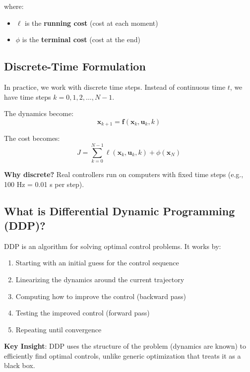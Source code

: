 \documentclass[11pt,a4paper]{article}
\begin{document}
where:
\begin{itemize}
    \item $\ell$ is the \textbf{running cost} (cost at each moment)
    \item $\phi$ is the \textbf{terminal cost} (cost at the end)
\end{itemize}

\subsection{Discrete-Time Formulation}

In practice, we work with discrete time steps. Instead of continuous time $t$, we have time steps $k = 0, 1, 2, \ldots, N-1$.

The dynamics become:
\begin{equation}
\mathbf{x}_{k+1} = \mathbf{f}(\mathbf{x}_k, \mathbf{u}_k, k)
\end{equation}

The cost becomes:
\begin{equation}
J = \sum_{k=0}^{N-1} \ell(\mathbf{x}_k, \mathbf{u}_k, k) + \phi(\mathbf{x}_N)
\end{equation}

\textbf{Why discrete?} Real controllers run on computers with fixed time steps (e.g., 100 Hz = 0.01 s per step).

\subsection{What is Differential Dynamic Programming (DDP)?}

DDP is an algorithm for solving optimal control problems. It works by:
\begin{enumerate}
    \item Starting with an initial guess for the control sequence
    \item Linearizing the dynamics around the current trajectory
    \item Computing how to improve the control (backward pass)
    \item Testing the improved control (forward pass)
    \item Repeating until convergence
\end{enumerate}

\textbf{Key Insight}: DDP uses the structure of the problem (dynamics are known) to efficiently find optimal controls, unlike generic optimization that treats it as a black box.
\end{document}
